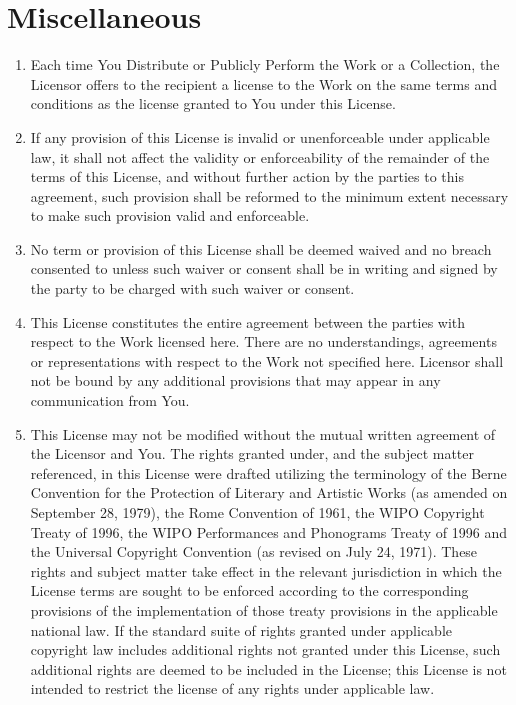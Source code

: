\section{Miscellaneous}
\begin{enumerate}
 \item Each time You Distribute or Publicly Perform the Work or a
       Collection, the Licensor offers to the recipient a license to the
       Work on the same terms and conditions as the license granted to
       You under this License.
 \item If any provision of this License is invalid or unenforceable
       under applicable law, it shall not affect the validity or
       enforceability of the remainder of the terms of this License, and
       without further action by the parties to this agreement, such
       provision shall be reformed to the minimum extent necessary to
       make such provision valid and enforceable.
 \item No term or provision of this License shall be deemed waived and
       no breach consented to unless such waiver or consent shall be in
       writing and signed by the party to be charged with such waiver or
       consent.
 \item This License constitutes the entire agreement between the parties
       with respect to the Work licensed here. There are no
       understandings, agreements or representations with respect to the
       Work not specified here. Licensor shall not be bound by any
       additional provisions that may appear in any communication from
       You.
 \item This License may not be modified without the mutual written
       agreement of the Licensor and You. The rights granted under, and
       the subject matter referenced, in this License were drafted
       utilizing the terminology of the Berne Convention for the
       Protection of Literary and Artistic Works (as amended on
       September 28, 1979), the Rome Convention of 1961, the WIPO
       Copyright Treaty of 1996, the WIPO Performances and Phonograms
       Treaty of 1996 and the Universal Copyright Convention (as revised
       on July 24, 1971). These rights and subject matter take effect in
       the relevant jurisdiction in which the License terms are sought
       to be enforced according to the corresponding provisions of the
       implementation of those treaty provisions in the applicable
       national law. If the standard suite of rights granted under
       applicable copyright law includes additional rights not granted
       under this License, such additional rights are deemed to be
       included in the License; this License is not intended to restrict
       the license of any rights under applicable law.
\end{enumerate}
